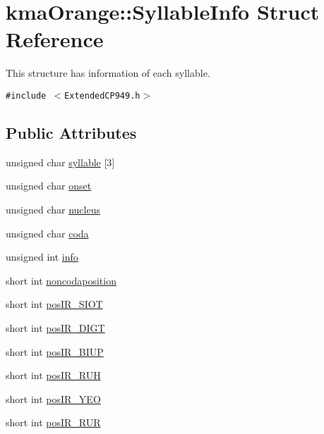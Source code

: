 \hypertarget{structkmaOrange_1_1SyllableInfo}{
\section{kmaOrange::SyllableInfo Struct Reference}
\label{structkmaOrange_1_1SyllableInfo}
}
This structure has information of each syllable.  


{\tt \#include $<$ExtendedCP949.h$>$}

\subsection*{Public Attributes}
\begin{CompactItemize}
\item 
unsigned char \hyperlink{structkmaOrange_1_1SyllableInfo_4d670961ef45eec1dfc058d663203933}{syllable} \mbox{[}3\mbox{]}
\item 
unsigned char \hyperlink{structkmaOrange_1_1SyllableInfo_e1fe1b8ac752b39844a547d628df0117}{onset}
\item 
unsigned char \hyperlink{structkmaOrange_1_1SyllableInfo_17ae21365151c3aa679c71b6808465fd}{nucleus}
\item 
unsigned char \hyperlink{structkmaOrange_1_1SyllableInfo_a6a8c8ba7cd384ca890d13a29a3237cb}{coda}
\item 
unsigned int \hyperlink{structkmaOrange_1_1SyllableInfo_f59a8e2891f6b3a66d6c55bf8cfa92d0}{info}
\item 
short int \hyperlink{structkmaOrange_1_1SyllableInfo_53cf76e4408d6e2ae9f2eb8579164f5d}{noncodaposition}
\item 
short int \hyperlink{structkmaOrange_1_1SyllableInfo_d18d17adb38c372d995a7cb34d100472}{posIR\_\-SIOT}
\item 
short int \hyperlink{structkmaOrange_1_1SyllableInfo_d05b566017dcb1834959282fddbd1a17}{posIR\_\-DIGT}
\item 
short int \hyperlink{structkmaOrange_1_1SyllableInfo_edc0b4e09fca243443b18ca05ddedc03}{posIR\_\-BIUP}
\item 
short int \hyperlink{structkmaOrange_1_1SyllableInfo_3999fedd6625cb23e89dce860769defb}{posIR\_\-RUH}
\item 
short int \hyperlink{structkmaOrange_1_1SyllableInfo_2be39bb82a8f8492fc51e449246b166d}{posIR\_\-YEO}
\item 
short int \hyperlink{structkmaOrange_1_1SyllableInfo_41f28a49807a3a05ebd1a84a31562cac}{posIR\_\-RUR}
\item 

\end{CompactItemize}

